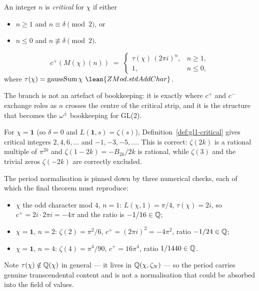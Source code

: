 \begin{definition}
  \label{def:gl1-critical}
  \leanok
  An integer $n$ is \emph{critical} for $\chi$ if either
  \begin{itemize}
    \item $n \geq 1$ and $n \equiv \delta \pmod 2$, or
    \item $n \leq 0$ and $n \not\equiv \delta \pmod 2$.
  \end{itemize}
\end{definition}

\begin{definition}[Period]
  \label{def:gl1-period}
  \leanok
  \[
    c^{+}(M(\chi)(n)) \;=\;
    \begin{cases}
      \tau(\chi)\,(2\pi i)^{n}, & n \geq 1,\\
      1, & n \leq 0,
    \end{cases}
  \]
  where $\tau(\chi) = \operatorname{gaussSum} \chi\ \lean{ZMod.stdAddChar}$.
\end{definition}

The branch is not an artefact of bookkeeping: it is exactly where $c^{+}$ and $c^{-}$
exchange roles as $n$ crosses the centre of the critical strip, and it is the
structure that becomes the $\omega^{\pm}$ bookkeeping for GL(2).

\begin{remark}
  \label{rem:zeta-sanity}
  For $\chi = \mathbf{1}$ (so $\delta = 0$ and $L(\mathbf{1},s) = \zeta(s)$),
  Definition~\ref{def:gl1-critical} gives critical integers $2,4,6,\dots$ and
  $-1,-3,-5,\dots$. This is correct: $\zeta(2k)$ is a rational multiple of
  $\pi^{2k}$ and $\zeta(1-2k) = -B_{2k}/2k$ is rational, while $\zeta(3)$ and the
  trivial zeros $\zeta(-2k)$ are correctly excluded.

  The period normalisation is pinned down by three numerical checks, each of which
  the final theorem must reproduce:
  \begin{itemize}
    \item $\chi$ the odd character mod $4$, $n=1$: $L(\chi,1) = \pi/4$, $\tau(\chi) = 2i$,
      so $c^{+} = 2i \cdot 2\pi i = -4\pi$ and the ratio is $-1/16 \in \mathbb{Q}$;
    \item $\chi = \mathbf{1}$, $n=2$: $\zeta(2) = \pi^2/6$, $c^{+} = (2\pi i)^2 = -4\pi^2$,
      ratio $-1/24 \in \mathbb{Q}$;
    \item $\chi = \mathbf{1}$, $n=4$: $\zeta(4) = \pi^4/90$, $c^{+} = 16\pi^4$,
      ratio $1/1440 \in \mathbb{Q}$.
  \end{itemize}
  Note $\tau(\chi) \notin \mathbb{Q}(\chi)$ in general --- it lives in $\mathbb{Q}(\chi,\zeta_N)$ ---
  so the period carries genuine transcendental content and is not a normalisation
  that could be absorbed into the field of values.
\end{remark}

